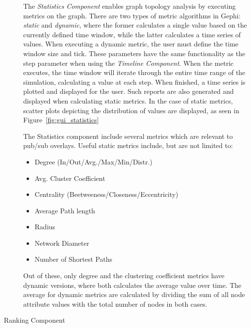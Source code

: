 \begin{description}
    The \emph{Statistics Component} enables graph topology analysis by
    executing metrics on the graph. There are two types of metric
    algorithms in Gephi: \emph{static} and \emph{dynamic}, where the
    former calculates a single value based on the currently defined time
    window, while the latter calculates a time series of values. When
    executing a dynamic metric, the user must define the time window
    size and tick. These parameters have the same functionality as the step parameter
    when using the \emph{Timeline Component}. When the metric executes, the
    time window will iterate through the entire time range of the
    simulation, calculating a value at each step. When finished,
    a time series is plotted and displayed for the user. Such reports
    are also generated and displayed when calculating static metrics. In
    the case of static metrics, scatter plots depicting the distribution
    of values are displayed, as seen in Figure~\ref{fig:gui_statistics}

    The Statistics component include several metrics which are relevant
    to pub/sub overlays. Useful static metrics include, but are not
    limited to:

    \begin{itemize}
        \item{Degree (In/Out/Avg./Max/Min/Distr.)}
        \item{Avg. Cluster Coefficient}
        \item{Centrality (Beetweeness/Closeness/Eccentricity)}
        \item{Average Path length}
        \item{Radius}
        \item{Network Diameter}
        \item{Number of Shortest Paths}
    \end{itemize}

    Out of these, only degree and the clustering coefficient metrics have dynamic
    versions, where both calculates the average value over time. The
    average for dynamic metrics are calculated by dividing the sum of
    all node attribute values with the total number of nodes in both
    cases.

\item[Ranking Component] \hfill \\


\end{description}
